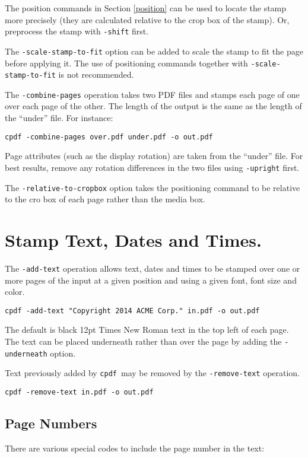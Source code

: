 \documentclass{book}
\newcommand{\cpdf}{\texttt{cpdf}}
\begin{document}
\noindent The position commands in Section \ref{position} can be used to locate the stamp more precisely (they are calculated relative to the crop box of the stamp). Or, preprocess the stamp with \texttt{-shift} first.

The \texttt{-scale-stamp-to-fit} option can be added to scale the stamp to fit the page before applying it. The use of positioning commands together with \texttt{-scale-stamp-to-fit} is not recommended.

  The \texttt{-combine-pages} operation takes two PDF files and stamps each
page of one over each page of the other. The length of the output is the same
as the length of the ``under'' file. For instance:
  \begin{framed}
    \small\verb!cpdf -combine-pages over.pdf under.pdf -o out.pdf!
  \end{framed}

\noindent Page attributes (such as the display rotation) are taken from the ``under''
file. For best results, remove any rotation differences in the two files using
\texttt{-upright} first.

\noindent The \texttt{-relative-to-cropbox} option takes the positioning command to be relative to the cro box of each page rather than the media box.

  \section{Stamp Text, Dates and Times.}
  The \texttt{-add-text} operation allows text, dates and times to be stamped
over one or more pages of the input at a given position and using a given font,
font size and color.
  \begin{framed}
    \small\verb!cpdf -add-text "Copyright 2014 ACME Corp." in.pdf -o out.pdf!
  \end{framed}
  \noindent The default is black 12pt Times New Roman text in the top left of each page. The text can be placed underneath rather than over the page by adding the \texttt{-underneath} option.
  
  Text previously added by \cpdf\ may be removed by the \texttt{-remove-text} operation.
  \begin{framed}
    \small\verb!cpdf -remove-text in.pdf -o out.pdf!
  \end{framed}

  \subsection{Page Numbers}
  There are various special codes to include the page number in the text:
\end{document}

